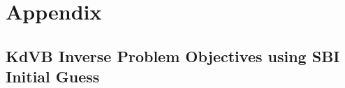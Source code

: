 \documentclass[%
 reprint,
 amsmath,amssymb,
 aps,
 pre,
]{revtex4-2}
\begin{document}



\section{Appendix}\label{secAppendix}
% 
\subsection{KdVB Inverse Problem Objectives using SBI Initial Guess}\label{secAppKdVBSBI}
\end{document}
